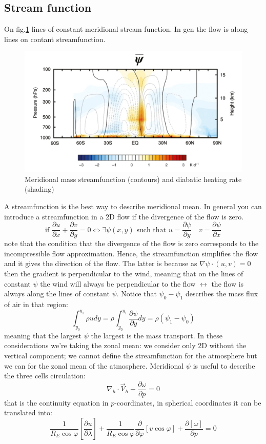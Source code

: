 \subsection{Stream function}
On fig.\ref{fig:meridional streamf} lines of constant meridional stream function. In gen the flow is along lines on contant streamfunction. 
\begin{figure}
    \centering
    \includegraphics[width=0.5\linewidth]{uploads/streamf.png}
    \caption{Meridional mass streamfunction (contours) and diabatic heating rate (shading)}
    \label{fig:meridional streamf}
\end{figure}
A streamfunction is the best way to describe meridional mean. In general you can introduce a streamfunction in a 2D flow if the divergence of the flow is zero.
\[\text{if }\frac{\partial u}{\partial x}+\frac{\partial v}{\partial y}=0\Leftrightarrow \exists \psi(x,y)\text{ such that } u=\frac{\partial\psi}{\partial y}\quad v=\frac{\partial\psi}{\partial x}\]
note that the condition that the divergence of the flow is zero corresponds to the incompressible flow approximation. Hence, the streamfunction simplifies the flow and it gives the direction of the flow. The latter is because as $\nabla\psi\cdot(u,v)=0$ then the gradient is perpendicular to the wind, meaning that on the lines of constant $\psi$ the wind will always be perpendicular to the flow $\leftrightarrow$ the flow is always along the lines of constant $\psi$.
Notice that $\psi_0-\psi_1$ describes the mass flux of air in that region:
\[\int_{y_0}^{y_1}\rho udy=\rho\int_{y_0}^{y_1}\frac{\partial\psi}{\partial y}dy=\rho(\psi_1-\psi_0)\]
meaning that the largest $\psi$ the largest is the mass transport. In these considerations we're taking the zonal mean: we consider only 2D without the vertical component; we cannot define the streamfunction for the atmosphere but we can for the zonal mean of the atmosphere. Meridional $\psi$ is useful to describe the three cells circulation:
\[\nabla_h\cdot\vec{V}_h+\frac{\partial\omega}{\partial p}=0\] that is the continuity equation in $p$-coordinates, in spherical coordinates it can be translated into:
\[\frac{1}{R_E\cos\varphi}\left[\frac{\partial u}{\partial\lambda}\right]+\frac{1}{R_E\cos\varphi}\frac{\partial}{\partial\varphi}\left[v\cos\varphi\right]+\frac{\partial[\omega]}{\partial p}=0\]
